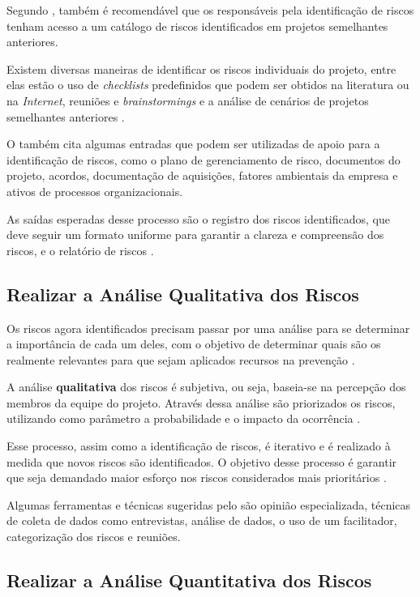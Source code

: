 \documentclass[
    12pt,       %
    openright,      %
    twoside,      %
    a4paper,      %
    english,      %
    french,       %
    spanish,      %
    brazil,       %
    ]{abntex2}
\begin{document}
Segundo , também é recomendável que os responsáveis pela identificação de riscos tenham acesso a um catálogo de riscos identificados em projetos semelhantes anteriores. 

Existem diversas maneiras de identificar os riscos individuais do projeto, entre elas estão o uso de \textit{checklists} predefinidos que podem ser obtidos na literatura ou na \textit{Internet}, reuniões e \textit{brainstormings} e a análise de cenários de projetos semelhantes anteriores \cite{WAZLAWICK:2013}.

O  também cita algumas entradas que podem ser utilizadas de apoio para a identificação de riscos, como o plano de gerenciamento de risco, documentos do projeto, acordos, documentação de aquisições, fatores ambientais da empresa e ativos de processos organizacionais.

As saídas esperadas desse processo são o registro dos riscos identificados, que deve seguir um formato uniforme para garantir a clareza e compreensão dos riscos, e o relatório de riscos \cite{PMBOK:2017}. 

\subsection{Realizar a Análise Qualitativa dos Riscos}

Os riscos agora identificados precisam passar por uma análise para se determinar a importância de cada um deles, com o objetivo de determinar quais são os realmente relevantes para que sejam aplicados recursos na prevenção \cite{WAZLAWICK:2013}.

A análise \textbf{qualitativa} dos riscos é subjetiva, ou seja, baseia-se na percepção dos membros da equipe do projeto. Através dessa análise são priorizados os riscos, utilizando como parâmetro a probabilidade e o impacto da ocorrência \cite{PMBOK:2017}.

Esse processo, assim como a identificação de riscos, é iterativo e é realizado à medida que novos riscos são identificados. O objetivo desse processo é garantir que seja demandado maior esforço nos riscos considerados mais prioritários \cite{PMBOK:2017}.

Algumas ferramentas e técnicas sugeridas pelo  são opinião especializada, técnicas de coleta de dados como entrevistas, análise de dados, o uso de um facilitador, categorização dos riscos e reuniões.

\subsection{Realizar a Análise Quantitativa dos Riscos}
\end{document}

